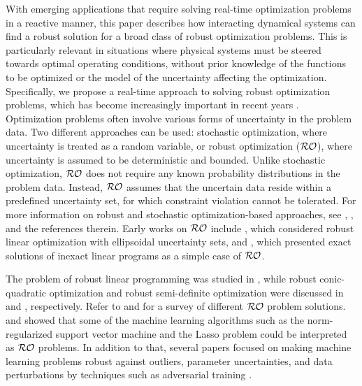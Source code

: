 \documentclass[journal,twoside,web]{ieeecolor}
\begin{document}
With emerging applications that require solving real-time optimization problems in a reactive manner, this paper describes how interacting dynamical systems can find a robust solution for a broad class of robust optimization problems. This is particularly relevant in situations where physical systems must be steered towards optimal operating conditions, without prior knowledge of the functions to be optimized or the model of the uncertainty affecting the optimization. Specifically, we propose a real-time approach to solving robust optimization problems, which has become increasingly important in recent years \cite{he2022}. Optimization problems often involve various forms of uncertainty in the problem data. Two different approaches can be used: stochastic optimization, where uncertainty is treated as a random variable, or robust optimization (${\cal RO}$), where uncertainty is assumed to be deterministic and bounded. Unlike stochastic optimization, ${\cal RO}$ does not require any known probability distributions in the problem data. Instead, ${\cal RO}$ assumes that the uncertain data reside within a predefined uncertainty set, for which constraint violation cannot be tolerated. For more information on robust and stochastic optimization-based approaches, see \cite{bental2009}, \cite{bertsimas2011}, and the references therein. Early works on ${\cal RO}$ include \cite{soyster1976}, which considered robust linear optimization with ellipsoidal uncertainty sets, and \cite{falk1976}, which presented exact solutions of inexact linear programs as a simple case of ${\cal RO}$.

The problem of robust linear programming was studied in \cite{bental1999}, while robust conic-quadratic optimization and robust semi-definite optimization were discussed in \cite{bental2002} and \cite{bental1998}, respectively. Refer to \cite{bertsimas2011} and \cite{beyer2007} for a survey of different ${\cal RO}$ problem solutions.
\cite{xu2009} and \cite{xu2010} showed that some of the machine learning algorithms such as the norm-regularized support vector machine and the Lasso problem could be interpreted as ${\cal RO}$ problems. In addition to that, several papers focused on making machine learning problems robust against outliers, parameter uncertainties, and data perturbations by techniques such as adversarial training \cite{lanckriet2003, bhattacharyya2004a, bhattacharyya2004b, trafalis2007, namkoong2016, sinha2018, esfandiari2019}.
\end{document}
